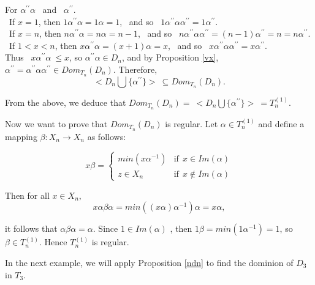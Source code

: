 \documentclass[10pt]{extarticle}
\numberwithin{equation}{section}
\numberwithin{bbb}{section}
\numberwithin{equation}{section}
\begin{document}
\vspace{0.5cm}
For $\alpha^{\prime\prime}\alpha$ \ and \ $\alpha^{\prime\prime}$.\\
\vspace{0.1cm}
\ If $x=1$, then $1\alpha^{\prime\prime}\alpha=1\alpha=1$, \ and so \ $1\alpha^{\prime\prime}\alpha\alpha^{\prime\prime}=1\alpha^{\prime\prime}$.\\
    \vspace{0.1cm}
\ If $x=n$, then $n\alpha^{\prime\prime}\alpha=n\alpha=n-1$, \ and so \ $n\alpha^{\prime\prime}\alpha\alpha^{\prime\prime}=(n-1)\alpha^{\prime\prime}=n=n\alpha^{\prime\prime}$.\\
\vspace{0.1cm}
\ If $1<x<n$, then $x\alpha^{\prime\prime}\alpha=(x+1)\alpha=x$, \ and so \ $x\alpha^{\prime\prime}\alpha\alpha^{\prime\prime}=x\alpha^{\prime\prime}$.\\ Thus \
$x\alpha^{\prime\prime}\alpha\ \leq x$, so
$\alpha^{\prime\prime}\alpha\in D_n$, and by Proposition \ref{vx}, $\alpha^{\prime\prime}=\alpha^{\prime\prime}\alpha\alpha^{\prime\prime} \in Dom_{T_n}(D_n)$. Therefore, 
$$<D_n \bigcup \{{\alpha^{\prime\prime}}\}> \ \subseteq Dom_{T_n}(D_n).$$

\vspace{0.5cm}
From the above, we deduce that $Dom_{T_n}(D_n) = \ <D_n \bigcup \{{\alpha^{\prime\prime}}\}> \ =T_n^{(1)}.$

\vspace{1cm}
Now we want to prove that $Dom_{T_{n}}(D_n)$ is regular. Let $\alpha \in T^{(1)}_n$ and define a mapping $\beta:X_n \rightarrow X_n$ as follows:
    
    \begin{equation*}
    x\beta= \begin{cases}
     min(x\alpha^{-1}) & \text{if} \ \ x\in Im(\alpha) \\
    z\in X_n  & \text{if} \ \ x\notin Im(\alpha)
    \end{cases}
\end{equation*}

\vspace{0.8cm}
 Then for all $x \in X_n,$ 
 $$x\alpha\beta\alpha=min((x\alpha)\alpha^{-1})\alpha=x\alpha,$$
 
 it follows that $\alpha\beta\alpha=\alpha$.
 Since $1 \in Im(\alpha)$ , then $1\beta=min(1\alpha^{-1})=1$, so $\beta \in T^{(1)}_n.$ Hence $T^{(1)}_n$ is regular.

\vspace{0.5cm}
In the next example, we will apply Proposition \ref{ndn} to find the dominion of $D_3$ in $T_3$.
\end{document}

